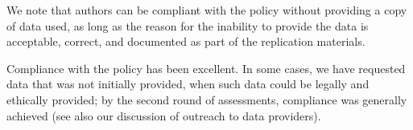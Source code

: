 



\label{sec:compliance}

We note that authors can be compliant with the policy without providing a copy of data used, as long as the reason for the inability to provide the data is acceptable, correct, and documented as part of the replication materials. 

Compliance with the policy %
has been excellent. In some cases, we have requested data that was not initially provided, when such data could be legally and ethically provided; by the second round of assessments, compliance was generally achieved (see also our discussion of outreach to data providers).

